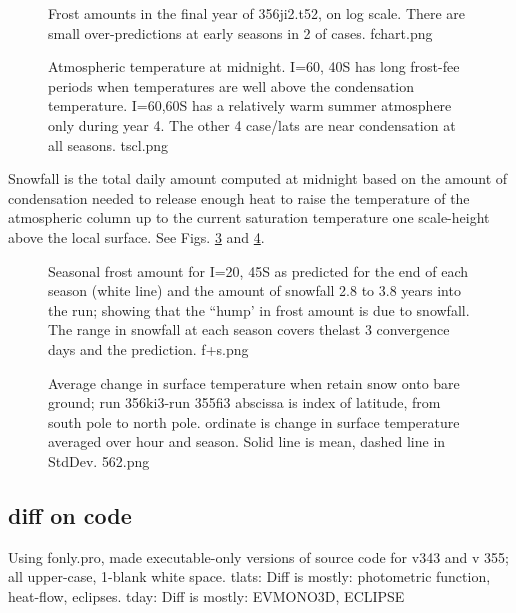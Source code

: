 \documentclass{article}
\begin{document}
\begin{figure}[!ht] 
\caption[Frost for v356]{Frost amounts in the final year of 356ji2.t52, on log
  scale. There are small over-predictions at early seasons in 2 of cases.
\label{fchart}  fchart.png }
\end{figure} 

\begin{figure}[!ht] 
\caption[Tatm at midnight]{Atmospheric temperature at midnight. I=60, 40S has
  long frost-fee periods when temperatures are well above the condensation
  temperature. I=60,60S has a relatively warm summer atmosphere only during year
  4. The other 4 case/lats are near condensation at all seasons.
\label{tscl}  tscl.png }
\end{figure} 

Snowfall is the total daily amount computed at midnight based on the amount of
condensation needed to release enough heat to raise the temperature of the
atmospheric column up to the current saturation temperature one scale-height
above the local surface. See Figs. \ref{f+s} and \ref{562}.

\begin{figure}[!ht] 
\caption[Seasonal frost at 45S for I=20]{Seasonal frost amount for I=20, 45S as
  predicted for the end of each season (white line) and the amount of snowfall
  2.8 to 3.8 years into the run; showing that the ``hump' in frost amount is due
  to snowfall. The range in snowfall at each season covers thelast 3 convergence days and the prediction.
\label{f+s}  f+s.png }
\end{figure} 


\begin{figure}[!ht] 
\caption[Tsurf change when first snow retained]{Average change in surface temperature when
  retain snow onto bare ground; run 356ki3-run 355fi3 abscissa is index of
  latitude, from south pole to north pole. ordinate is change in surface
  temperature averaged over hour and season.  Solid line is mean, dashed line
  in StdDev.
\label{562}  562.png }
\end{figure} 

\clearpage
\subsection{diff on code}
Using fonly.pro, made executable-only versions of source code for v343 and v 355; all upper-case, 1-blank white space.
tlats: Diff is mostly: photometric function, heat-flow, eclipses.
tday: Diff is mostly: EVMONO3D, ECLIPSE 
\end{document}
